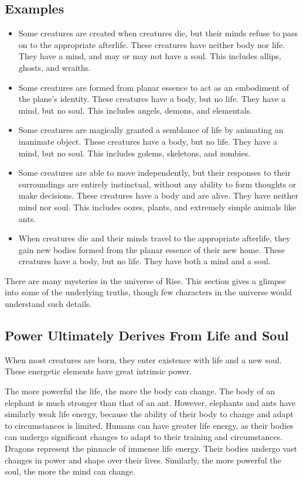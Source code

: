   \subsection{Examples}
    \begin{itemize}
      \item Some creatures are created when creatures die, but their minds refuse to pass on to the appropriate afterlife. These creatures have neither body nor life. They have a mind, and may or may not have a soul. This includes allips, ghosts, and wraiths.
      \item Some creatures are formed from planar essence to act as an embodiment of the plane's identity. These creatures have a body, but no life. They have a mind, but no soul. This includes angels, demons, and elementals.
      \item Some creatures are magically granted a semblance of life by animating an inanimate object. These creatures have a body, but no life. They have a mind, but no soul. This includes golems, skeletons, and zombies.
      \item Some creatures are able to move independently, but their responses to their surroundings are entirely instinctual, without any ability to form thoughts or make decisions. These creatures have a body and are alive. They have neither mind nor soul. This includes oozes, plants, and extremely simple animals like ants.
      \item When creatures die and their minds travel to the appropriate afterlife, they gain new bodies formed from the planar essence of their new home. These creatures have a body, but no life. They have both a mind and a soul.
    \end{itemize}


  There are many mysteries in the universe of Rise.
  This section gives a glimpse into some of the underlying truths, though few characters in the universe would understand such details.

  \subsection{Power Ultimately Derives From Life and Soul}
    When most creatures are born, they enter existence with life and a new soul.
    These energetic elements have great intrinsic power.

    The more powerful the life, the more the body can change.
    The body of an elephant is much stronger than that of an ant.
    However, elephants and ants have similarly weak life energy, because the ability of their body to change and adapt to circumstances is limited.
    Humans can have greater life energy, as their bodies can undergo significant changes to adapt to their training and circumstances.
    Dragons represent the pinnacle of immense life energy.
    Their bodies undergo vast changes in power and shape over their lives.
    Similarly, the more powerful the soul, the more the mind can change.

